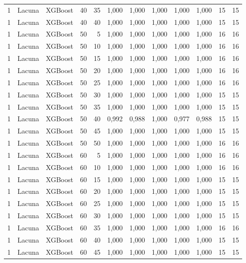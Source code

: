 \begin{longtable}{@{}rllrrrrrrrrr@{}}
1 & Lacuna & XGBoost & 40 & 35 & 1,000 & 1,000 & 1,000 & 1,000 & 1,000 & 15 & 15 \\
1 & Lacuna & XGBoost & 40 & 40 & 1,000 & 1,000 & 1,000 & 1,000 & 1,000 & 15 & 15 \\
1 & Lacuna & XGBoost & 50 & 5 & 1,000 & 1,000 & 1,000 & 1,000 & 1,000 & 16 & 16 \\
1 & Lacuna & XGBoost & 50 & 10 & 1,000 & 1,000 & 1,000 & 1,000 & 1,000 & 16 & 16 \\
1 & Lacuna & XGBoost & 50 & 15 & 1,000 & 1,000 & 1,000 & 1,000 & 1,000 & 16 & 16 \\
1 & Lacuna & XGBoost & 50 & 20 & 1,000 & 1,000 & 1,000 & 1,000 & 1,000 & 16 & 16 \\
1 & Lacuna & XGBoost & 50 & 25 & 1,000 & 1,000 & 1,000 & 1,000 & 1,000 & 16 & 16 \\
1 & Lacuna & XGBoost & 50 & 30 & 1,000 & 1,000 & 1,000 & 1,000 & 1,000 & 15 & 15 \\
1 & Lacuna & XGBoost & 50 & 35 & 1,000 & 1,000 & 1,000 & 1,000 & 1,000 & 15 & 15 \\
1 & Lacuna & XGBoost & 50 & 40 & 0,992 & 0,988 & 1,000 & 0,977 & 0,988 & 15 & 15 \\
1 & Lacuna & XGBoost & 50 & 45 & 1,000 & 1,000 & 1,000 & 1,000 & 1,000 & 15 & 15 \\
1 & Lacuna & XGBoost & 50 & 50 & 1,000 & 1,000 & 1,000 & 1,000 & 1,000 & 16 & 16 \\
1 & Lacuna & XGBoost & 60 & 5 & 1,000 & 1,000 & 1,000 & 1,000 & 1,000 & 16 & 16 \\
1 & Lacuna & XGBoost & 60 & 10 & 1,000 & 1,000 & 1,000 & 1,000 & 1,000 & 16 & 16 \\
1 & Lacuna & XGBoost & 60 & 15 & 1,000 & 1,000 & 1,000 & 1,000 & 1,000 & 15 & 15 \\
1 & Lacuna & XGBoost & 60 & 20 & 1,000 & 1,000 & 1,000 & 1,000 & 1,000 & 15 & 15 \\
1 & Lacuna & XGBoost & 60 & 25 & 1,000 & 1,000 & 1,000 & 1,000 & 1,000 & 15 & 15 \\
1 & Lacuna & XGBoost & 60 & 30 & 1,000 & 1,000 & 1,000 & 1,000 & 1,000 & 15 & 15 \\
1 & Lacuna & XGBoost & 60 & 35 & 1,000 & 1,000 & 1,000 & 1,000 & 1,000 & 16 & 16 \\
1 & Lacuna & XGBoost & 60 & 40 & 1,000 & 1,000 & 1,000 & 1,000 & 1,000 & 15 & 15 \\
1 & Lacuna & XGBoost & 60 & 45 & 1,000 & 1,000 & 1,000 & 1,000 & 1,000 & 15 & 15 \\

\end{longtable}
